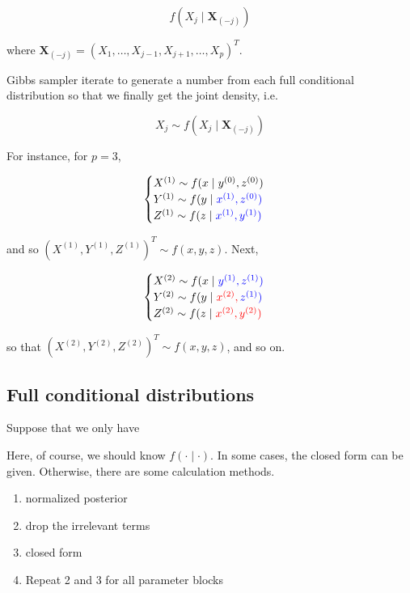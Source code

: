 \documentclass[]{book}
\providecommand{\tightlist}{%
  \setlength{\itemsep}{0pt}\setlength{\parskip}{0pt}}
\theoremstyle{definition}
\theoremstyle{definition}
\theoremstyle{definition}
\theoremstyle{remark}
\begin{document}
\[f(X_j \mid \mathbf{X}_{(-j)})\]

where \(\mathbf{X}_{(-j)} = (X_1, \ldots, X_{j - 1}, X_{j + 1}, \ldots, X_p)^T\).

Gibbs sampler iterate to generate a number from each full conditional distribution so that we finally get the joint density, i.e.

\[X_j \sim f(X_j \mid \mathbf{X}_{(-j)})\]

For instance, for \(p = 3\),

\[
\begin{cases}
  X^{(1)} \sim f(x \mid y^{(0)}, z^{(0)}) \\
  Y^{(1)} \sim f(y \mid \color{blue}{x^{(1)}}, z^{(0)}) \\
  Z^{(1)} \sim f(z \mid \color{blue}{x^{(1)}}, \color{blue}{y^{(1)}})
\end{cases}
\]

and so \((X^{(1)}, Y^{(1)}, Z^{(1)})^T \sim f(x, y, z)\). Next,

\[
\begin{cases}
  X^{(2)} \sim f(x \mid \color{blue}{y^{(1)}}, \color{blue}{z^{(1)}}) \\
  Y^{(2)} \sim f(y \mid \color{red}{x^{(2)}}, \color{blue}{z^{(1)}}) \\
  Z^{(2)} \sim f(z \mid \color{red}{x^{(2)}}, \color{red}{y^{(2)}})
\end{cases}
\]

so that \((X^{(2)}, Y^{(2)}, Z^{(2)})^T \sim f(x, y, z)\), and so on.

\hypertarget{full-conditional-distributions}{%
\subsection{Full conditional distributions}\label{full-conditional-distributions}}

Suppose that we only have

Here, of course, we should know \(f(\cdot \mid \cdot)\). In some cases, the closed form can be given. Otherwise, there are some calculation methods.

\begin{enumerate}
\def\labelenumi{\arabic{enumi}.}
\tightlist
\item
  normalized posterior
\item
  drop the irrelevant terms
\item
  closed form
\item
  Repeat 2 and 3 for all parameter blocks
\end{enumerate}
\end{document}
